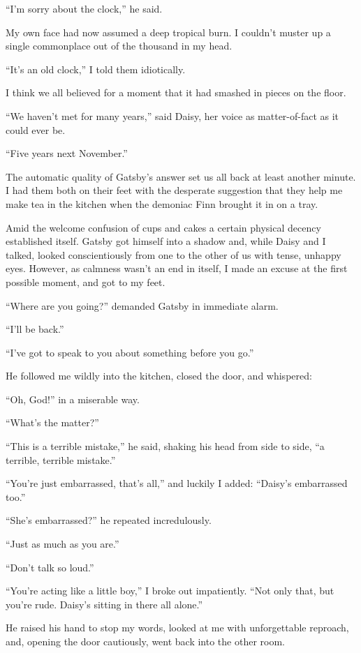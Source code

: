 \documentclass{znotebook}
\begin{document}
``I'm sorry about the clock,'' he said.

My own face had now assumed a deep tropical burn. I couldn't muster up a single commonplace out of the thousand in my head.

``It's an old clock,'' I told them idiotically.

I think we all believed for a moment that it had smashed in pieces on the floor.

``We haven't met for many years,'' said Daisy, her voice as matter-of-fact as it could ever be.

``Five years next November.''

The automatic quality of Gatsby's answer set us all back at least another minute. I had them both on their feet with the desperate suggestion that they help me make tea in the kitchen when the demoniac Finn brought it in on a tray.

Amid the welcome confusion of cups and cakes a certain physical decency established itself. Gatsby got himself into a shadow and, while Daisy and I talked, looked conscientiously from one to the other of us with tense, unhappy eyes. However, as calmness wasn't an end in itself, I made an excuse at the first possible moment, and got to my feet.

``Where are you going?'' demanded Gatsby in immediate alarm.

``I'll be back.''

``I've got to speak to you about something before you go.''

He followed me wildly into the kitchen, closed the door, and whispered:

``Oh, God!'' in a miserable way.

``What's the matter?''

``This is a terrible mistake,'' he said, shaking his head from side to side, ``a terrible, terrible mistake.''

``You're just embarrassed, that's all,'' and luckily I added: ``Daisy's embarrassed too.''

``She's embarrassed?'' he repeated incredulously.

``Just as much as you are.''

``Don't talk so loud.''

``You're acting like a little boy,'' I broke out impatiently. ``Not only that, but you're rude. Daisy's sitting in there all alone.''

He raised his hand to stop my words, looked at me with unforgettable reproach, and, opening the door cautiously, went back into the other room.
\end{document}
